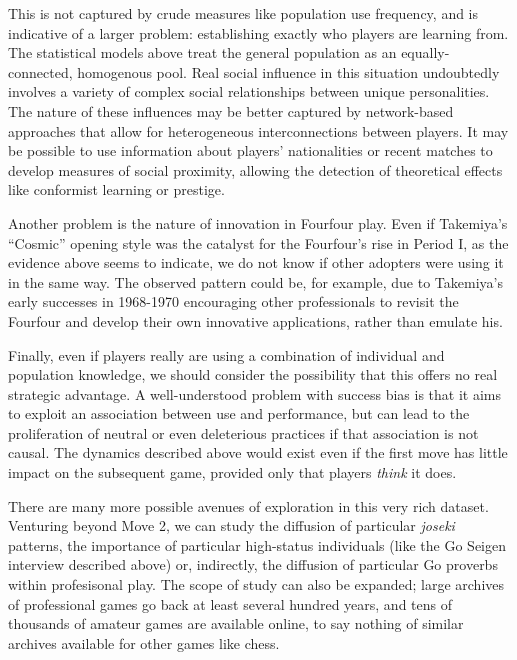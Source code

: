 This is not captured by crude measures like population use frequency, and is indicative of a larger problem: establishing exactly who players are learning from.  The statistical models above treat the general population as an equally-connected, homogenous pool.  Real social influence in this situation undoubtedly involves a variety of complex social relationships between unique personalities.  The nature of these influences may be better captured by network-based approaches that allow for heterogeneous interconnections between players.  It may be possible to use information about players' nationalities or recent matches to develop measures of social proximity, allowing the detection of theoretical effects like conformist learning or prestige.

Another problem is the nature of innovation in Fourfour play.  Even if Takemiya's ``Cosmic'' opening style was the catalyst for the Fourfour's rise in Period I, as the evidence above seems to indicate, we do not know if other adopters were using it in the same way.  The observed pattern could be, for example, due to Takemiya's early successes in 1968-1970 encouraging other professionals to revisit the Fourfour and develop their own innovative applications, rather than emulate his.  

Finally, even if players really are using a combination of individual and population knowledge, we should consider the possibility that this offers no real strategic advantage.  A well-understood problem with success bias is that it aims to exploit an association between use and performance, but can lead to the proliferation of neutral or even deleterious practices if that association is not causal.  The dynamics described above would exist even if the first move has little impact on the subsequent game, provided only that players \textit{think} it does. 

There are many more possible avenues of exploration in this very rich dataset.  Venturing beyond Move 2, we can study the diffusion of particular \textit{joseki} patterns, the importance of particular high-status individuals (like the Go Seigen interview described above) or, indirectly, the diffusion of particular Go proverbs within profesisonal play.  The scope of study can also be expanded; large archives of professional games go back at least several hundred years, and tens of thousands of amateur games are available online, to say nothing of similar archives available for other games like chess.  

